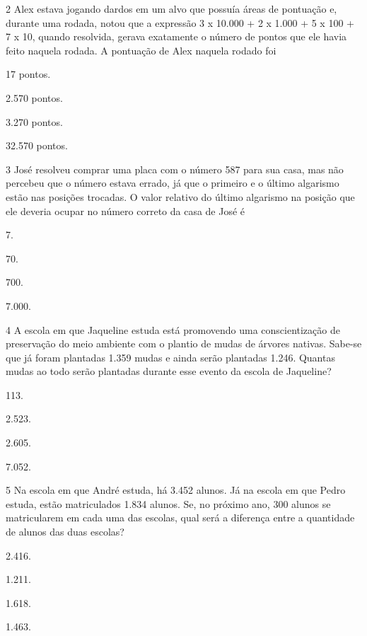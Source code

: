 \begin{mdframed}[linewidth=2pt,linecolor=salmao,roundcorner=2pt]
\begin{escolha}
{\begin{escolha}
\num{2} Alex estava jogando dardos em um alvo que possuía áreas de pontuação e,
durante uma rodada, notou que a expressão 3 x 10.000 + 2 x 1.000 + 5 x
100 + 7 x 10, quando resolvida, gerava exatamente o número de pontos que
ele havia feito naquela rodada. A pontuação de Alex naquela rodado foi

\begin{escolha}
\item
  17 pontos.
\item
  2.570 pontos.
\item
  3.270 pontos.
\item
  32.570 pontos.
\end{escolha}

\num{3} José resolveu comprar uma placa com o número 587 para sua casa, mas
não percebeu que o número estava
errado, já que o primeiro e o último algarismo estão nas posições
trocadas. O valor relativo do último algarismo na posição que ele deveria ocupar no número correto da casa de José é

\begin{escolha}
\item
  7.
\item
  70.
\item
  700.
\item
  7.000.
\end{escolha}



\num{4} A escola em que Jaqueline estuda está promovendo uma conscientização de
preservação do meio ambiente com o plantio de mudas de árvores
nativas. Sabe-se que já foram plantadas 1.359 mudas e ainda serão
plantadas 1.246. Quantas mudas ao todo serão plantadas durante esse
evento da escola de Jaqueline?

\begin{escolha}
\item
  113.
\item
  2.523.
\item
  2.605.
\item
  7.052.
\end{escolha}


\num{5} Na escola em que André estuda, há 3.452 alunos. Já na escola em que
Pedro estuda, estão matriculados 1.834 alunos. Se, no próximo ano, 300
alunos se matricularem em cada uma das escolas, qual será a diferença
entre a quantidade de alunos das duas escolas?

\begin{escolha}
\item
  2.416.
\item
  1.211.
\item
  1.618.
\item
  1.463.
\end{escolha}


\end{escolha}}
\end{escolha}
\end{mdframed}
